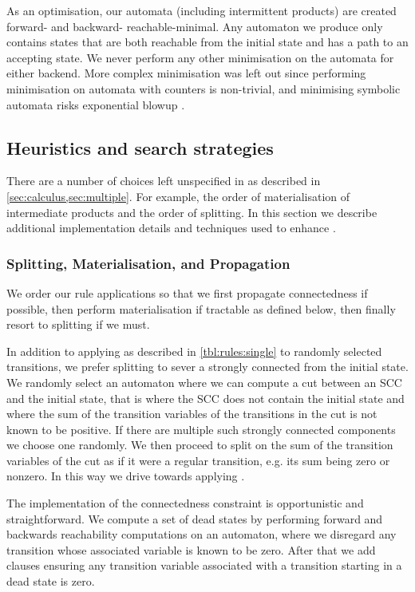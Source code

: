 \documentclass[acmsmall,review,anonymous,screen]{acmart}\settopmatter{printfolios=true,printccs=true,printacmref=true}
\theoremstyle{definition}
\begin{document}
As an optimisation, our automata (including intermittent products) are created
forward- and backward- reachable-minimal. Any automaton we produce only contains
states that are both reachable from the initial state and has a path to an
accepting state. We never perform any other minimisation on the automata for
either backend. More complex minimisation was left out since performing
minimisation on automata with counters is non-trivial, and minimising symbolic
automata risks exponential blowup \cite{minimising-symbolic}.

\subsection{Heuristics and search strategies}

There are a number of choices left unspecified in \Calculus{} as described in
\cref{sec:calculus,sec:multiple}. For example, the order of materialisation of
intermediate products and the order of splitting. In this section we describe
additional implementation details and techniques used to enhance \Catra.

\subsubsection{Splitting, Materialisation, and Propagation}

We order our rule applications so that we first propagate connectedness if
possible, then perform materialisation if tractable as defined below, then
finally resort to splitting if we must.

In addition to applying \Split{} as described in \cref{tbl:rules:single} to
randomly selected transitions, we prefer splitting to sever a strongly connected
from the initial state. We randomly select an automaton where we can compute a
cut between an SCC and the initial state, that is where the SCC does not contain
the initial state and where the sum of the transition variables of the
transitions in the cut is not known to be positive. If there are multiple such
strongly connected components we choose one randomly. We then proceed to split
on the sum of the transition variables of the cut as if it were a regular
transition, e.g. its sum being zero or nonzero. In this way we drive \Calculus{}
towards applying \Propagate{}.

The implementation of the connectedness constraint is opportunistic and straightforward. We compute a set of dead states by performing forward and backwards reachability computations on an automaton, where we disregard any transition whose associated variable is known to be zero. After that we add clauses ensuring any transition variable associated with a transition starting in a dead state is zero.
\end{document}
